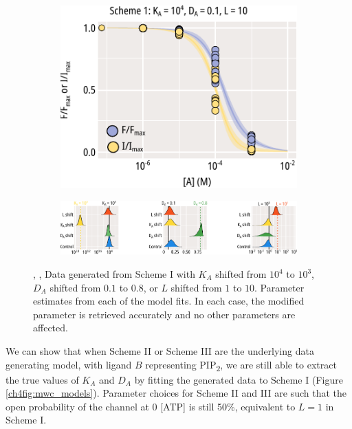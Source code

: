 \begin{figure}[h]
\begin{subfigure}[t]{0.3\textwidth}
		\centering
		\includegraphics[width=\textwidth]{mwc_scheme_1_l_shift.pdf}
	\end{subfigure}
	\vfill
	\begin{subfigure}[t]{0.9\textwidth}
		\caption{}\label{ch4fig:mwc_params_2}
		\centering
		\includegraphics[width=\textwidth]{mwc_scheme_param_fits_2.pdf}
	\end{subfigure}
	\caption[Parameter retrieval from MWC models]{
	, ,  Data generated from Scheme I with  $K_A$ shifted from $10^4$ to $10^3$,  $D_A$ shifted from $0.1$ to $0.8$, or  $L$ shifted from $1$ to $10$.
	 Parameter estimates from each of the model fits.
	In each case, the modified parameter is retrieved accurately and no other parameters are affected.
	}\label{ch4fig:scheme_1_shifts}
\end{figure}

We can show that when Scheme II or Scheme III are the underlying data generating model, with ligand $B$ representing PIP\textsubscript{2}, we are still able to extract the true values of $K_A$ and $D_A$ by fitting the generated data to Scheme I (Figure \ref{ch4fig:mwc_models}).
Parameter choices for Scheme II and III are such that the open probability of the channel at 0 [ATP] is still 50\%, equivalent to $L=1$ in Scheme I.

